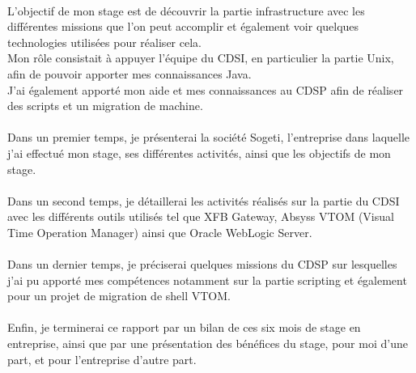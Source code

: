 \documentclass[a4paper,12pt]{report}
\begin{document}
\paragraph{}
L'objectif de mon stage est de découvrir la partie infrastructure avec les différentes missions que l'on peut accomplir et également voir quelques technologies utilisées pour réaliser cela.\\
Mon rôle consistait à appuyer l'équipe du CDSI, en particulier la partie Unix, afin de pouvoir apporter mes connaissances Java.\\
J'ai également apporté mon aide et mes connaissances au CDSP afin de réaliser des scripts et un migration de machine.

\paragraph{}
Dans un premier temps, je présenterai la société Sogeti, l'entreprise dans laquelle j'ai effectué mon stage, ses différentes activités, ainsi que les objectifs de mon stage.

\paragraph{}
Dans un second temps, je détaillerai les activités réalisés sur la partie du CDSI avec les différents outils utilisés tel que XFB Gateway, Absyss VTOM (Visual Time Operation Manager) ainsi que Oracle WebLogic Server.

\paragraph{}
Dans un dernier temps, je préciserai quelques missions du CDSP sur lesquelles j'ai pu apporté mes compétences notamment sur la partie scripting et également pour un projet de migration de shell VTOM.

\paragraph{}
Enfin, je terminerai ce rapport par un bilan de ces six mois de stage en entreprise, ainsi que par une présentation des bénéfices du stage, pour moi d'une part, et pour l'entreprise
d'autre part.



\tableofcontents
\end{document}
